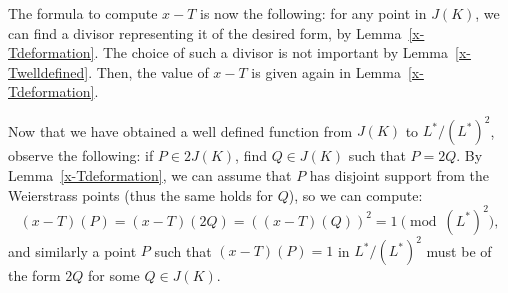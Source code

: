 \documentclass[a4paper, 12pt]{amsart}
\theoremstyle{definition}
\theoremstyle{plain}
\theoremstyle{plain}
\theoremstyle{plain}
\theoremstyle{plain}
\theoremstyle{remark}
\theoremstyle{remark}
\theoremstyle{plain}
\newcommand{\lemref}[1]{Lemma~\ref{#1}}
\begin{document}
	The formula to compute $x-T$ is now the following: for any point in $J(K)$, we can find a divisor representing it of the desired form, by \lemref{x-Tdeformation}. The choice of such a divisor is not important by \lemref{x-Twelldefined}. Then, the value of $x-T$ is given again in \lemref{x-Tdeformation}.
	
	Now that we have obtained a well defined function from $J(K)$ to $L^*/(L^*)^2$, observe the following: if $P\in 2J(K)$, find $Q\in J(K)$ such that $P=2Q$. By \lemref{x-Tdeformation}, we can assume that $P$ has disjoint support from the Weierstrass points (thus the same holds for $Q$), so we can compute:
	\begin{equation*}
		(x-T)(P)=(x-T)(2Q)=((x-T)(Q))^2=1\pmod {(L^*)^2},
	\end{equation*}
	and similarly a point $P$ such that $(x-T)(P)=1$ in $L^*/(L^*)^2$ must be of the form $2Q$ for some $Q\in J(K)$.
	
\end{document}

